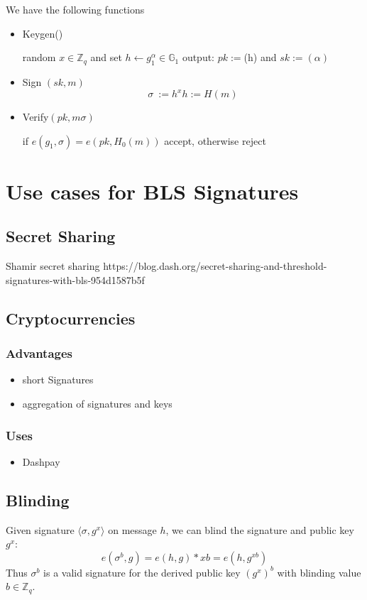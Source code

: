 \documentclass[a4paper,12pt]{scrartcl}
\begin{document}
We have the following functions
\begin{itemize}
	\item Keygen()
	\begin{center}
		random \( x\in \mathbb{Z}_{q} \) and set \( h \leftarrow g_{1}^\alpha\in \mathbb{G}_{1} \) output: \( pk := \)(h) and \( sk := (\alpha) \)
	\end{center}
	\item Sign \( (sk, m) \)
	\[ \sigma\ := h^x  h := H(m) \]
	\item Verify\( (pk, m \sigma) \)
	\begin{center}
		if \( e(g_{1},\sigma) = e(pk, H_{0}(m)) \) accept, otherwise reject
	\end{center}
\end{itemize}

\pagebreak

\section{Use cases for BLS Signatures}
\subsection{Secret Sharing}
Shamir secret sharing https://blog.dash.org/secret-sharing-and-threshold-signatures-with-bls-954d1587b5f
\subsection{Cryptocurrencies}
\subsubsection{Advantages}
\begin{itemize}
	\item short Signatures
	\item aggregation of signatures and keys
\end{itemize}

\subsubsection{Uses}
\begin{itemize}
	\item Dashpay
\end{itemize}

\subsection{Blinding}
Given signature \( \langle \sigma, g^x \rangle \) on message \( h \), we can blind the signature and public key \( g^x \):
\[ e(\sigma^b,g) = e(h,g)*{xb} = e(h,g^{xb}) \]
Thus \( \sigma^b \) is a valid signature for the derived public key \( (g^x)^b \) with blinding value \( b \in \mathbb{Z}_{q} \).\cite[PKI Slide 12]{crypto-slides-grothoff}
\pagebreak

\printbibliography
\end{document}
